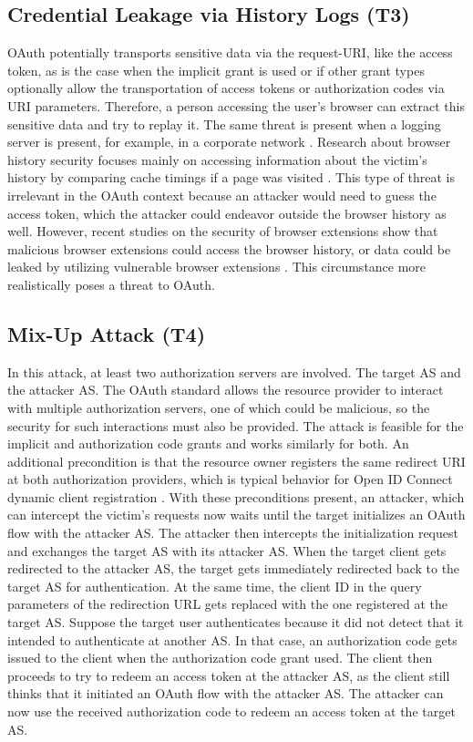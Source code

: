 \subsection[Credential Leakage via History Logs]{Credential Leakage via History Logs (T3)}
\label{threat:T3}
OAuth potentially transports sensitive data via the request-URI, like the access token, as is the case when the implicit grant is used or if other grant types optionally allow the transportation of access tokens or authorization codes via URI parameters. Therefore, a person accessing the user's browser can extract this sensitive data and try to replay it. The same threat is present when a logging server is present, for example, in a corporate network \cite{lodderstedt2020oauth}. Research about browser history security focuses mainly on accessing information about the victim's history by comparing cache timings if a page was visited \cite{bansalcache}. This type of threat is irrelevant in the OAuth context because an attacker would need to guess the access token, which the attacker could endeavor outside the browser history as well. However, recent studies on the security of browser extensions show that malicious browser extensions could access the browser history, or data could be leaked by utilizing vulnerable browser extensions \cite{eriksson2022}. This circumstance more realistically poses a threat to OAuth.

\subsection[Mix-Up Attack]{Mix-Up Attack (T4)}
\label{threat:T4}
In this attack, at least two authorization servers are involved. The target AS and the attacker AS. The OAuth standard allows the resource provider to interact with multiple authorization servers, one of which could be malicious, so the security for such interactions must also be provided. The attack is feasible for the implicit and authorization code grants and works similarly for both. An additional precondition is that the resource owner registers the same redirect URI at both authorization providers, which is typical behavior for Open ID Connect dynamic client registration \cite{hosseyni2023formal}. With these preconditions present, an attacker, which can intercept the victim's requests now waits until the target initializes an OAuth flow with the attacker AS. The attacker then intercepts the initialization request and exchanges the target AS with its attacker AS. When the target client gets redirected to the attacker AS, the target gets immediately redirected back to the target AS for authentication. At the same time, the client ID in the query parameters of the redirection URL gets replaced with the one registered at the target AS. Suppose the target user authenticates because it did not detect that it intended to authenticate at another AS. In that case, an authorization code gets issued to the client when the authorization code grant used. The client then proceeds to try to redeem an access token at the attacker AS, as the client still thinks that it initiated an OAuth flow with the attacker AS. The attacker can now use the received authorization code to redeem an access token at the target AS. \cite{fett2016comprehensive}

